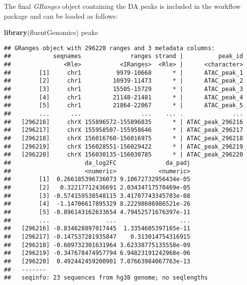 \documentclass[
]{article}
\newenvironment{Shaded}{}{}
\newcommand{\DataTypeTok}[1]{\textcolor[rgb]{0.56,0.13,0.00}{#1}}
\newcommand{\KeywordTok}[1]{\textcolor[rgb]{0.00,0.44,0.13}{\textbf{#1}}}
\newcommand{\NormalTok}[1]{#1}
\newcommand{\OperatorTok}[1]{\textcolor[rgb]{0.40,0.40,0.40}{#1}}
\newcommand{\StringTok}[1]{\textcolor[rgb]{0.25,0.44,0.63}{#1}}
\begin{document}
\begin{Shaded}
\end{Shaded}

The final \emph{GRanges} object containing the DA peaks is included in the workflow
package and can be loaded as follows:

\begin{Shaded}
\begin{Highlighting}[]
\KeywordTok{library}\NormalTok{(fluentGenomics)}
\NormalTok{peaks}
\end{Highlighting}
\end{Shaded}

\begin{verbatim}
## GRanges object with 296220 ranges and 3 metadata columns:
##            seqnames              ranges strand |          peak_id
##               <Rle>           <IRanges>  <Rle> |      <character>
##        [1]     chr1          9979-10668      * |      ATAC_peak_1
##        [2]     chr1         10939-11473      * |      ATAC_peak_2
##        [3]     chr1         15505-15729      * |      ATAC_peak_3
##        [4]     chr1         21148-21481      * |      ATAC_peak_4
##        [5]     chr1         21864-22067      * |      ATAC_peak_5
##        ...      ...                 ...    ... .              ...
##   [296216]     chrX 155896572-155896835      * | ATAC_peak_296216
##   [296217]     chrX 155958507-155958646      * | ATAC_peak_296217
##   [296218]     chrX 156016760-156016975      * | ATAC_peak_296218
##   [296219]     chrX 156028551-156029422      * | ATAC_peak_296219
##   [296220]     chrX 156030135-156030785      * | ATAC_peak_296220
##                     da_log2FC              da_padj
##                     <numeric>            <numeric>
##        [1]  0.266185396736073 9.10672732956434e-05
##        [2]   0.32217712436691 2.03434717570469e-05
##        [3] -0.574159538548115 3.41707743345703e-08
##        [4]  -1.14706617895329 8.22298606986521e-26
##        [5] -0.896143162633654 4.79452571676397e-11
##        ...                ...                  ...
##   [296216] -0.834628897017445  1.3354605397165e-11
##   [296217] -0.147537281935847    0.313014754316915
##   [296218] -0.609732301631964 3.62338775135558e-09
##   [296219] -0.347678474957794 6.94823191242968e-06
##   [296220]  0.492442459200901 7.07663984067763e-13
##   -------
##   seqinfo: 23 sequences from hg38 genome; no seqlengths
\end{verbatim}
\end{document}
